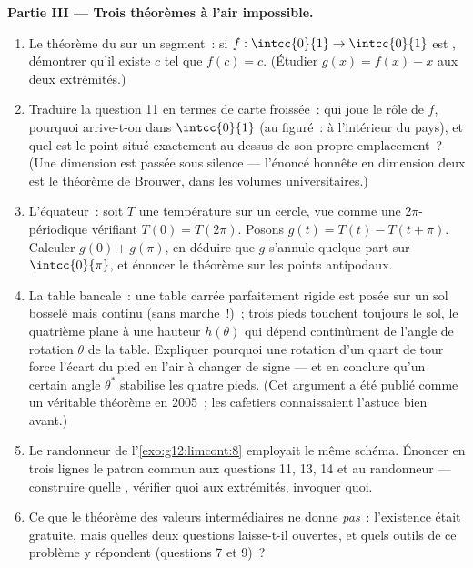 \begin{problem}
\medskip
\noindent\textbf{Partie III --- Trois théorèmes à l'air
impossible.}
\begin{enumerate}[resume]
  \item Le théorème du  sur un segment~: si
        $f : \intcc{0}{1} \to \intcc{0}{1}$ est , démontrer
        qu'il existe $c$ tel que $f(c) = c$. (Étudier
        $g(x) = f(x) - x$ aux deux extrémités.)
  \item Traduire la question 11 en termes de carte froissée~: qui
        joue le rôle de $f$, pourquoi arrive-t-on dans
        $\intcc{0}{1}$ (au figuré~: à l'intérieur du pays), et quel
        est le point situé exactement au-dessus de son propre
        emplacement~? (Une dimension est passée sous silence ---
        l'énoncé honnête en dimension deux est le théorème de
        Brouwer, dans les volumes universitaires.)
  \item L'équateur~: soit $T$ une température  sur un
        cercle, vue comme une  $2\pi$-périodique vérifiant
        $T(0) = T(2\pi)$. Posons $g(t) = T(t) - T(t + \pi)$.
        Calculer $g(0) + g(\pi)$, en déduire que $g$ s'annule
        quelque part sur $\intcc{0}{\pi}$, et énoncer le théorème
        sur les points antipodaux.
  \item La table bancale~: une table carrée parfaitement rigide est
        posée sur un sol bosselé mais continu (sans marche~!)~;
        trois pieds touchent toujours le sol, le quatrième plane à
        une hauteur $h(\theta)$ qui dépend continûment de l'angle de
        rotation $\theta$ de la table. Expliquer pourquoi une
        rotation d'un quart de tour force l'écart du pied en l'air à
        changer de signe --- et en conclure qu'un certain angle
        $\theta^*$ stabilise les quatre pieds. (Cet argument a été
        publié comme un véritable théorème en 2005~; les
        cafetiers connaissaient l'astuce bien avant.)
  \item Le randonneur de l'\cref{exo:g12:limcont:8} employait le
        même schéma. Énoncer en trois lignes le patron commun aux
        questions 11, 13, 14 et au randonneur --- construire quelle
        , vérifier quoi aux extrémités, invoquer quoi.
  \item Ce que le théorème des valeurs intermédiaires ne donne
        \emph{pas}~: l'existence était gratuite, mais quelles deux
        questions laisse-t-il ouvertes, et quels outils de ce
        problème y répondent (questions 7 et 9)~?
\end{enumerate}


\end{problem}
